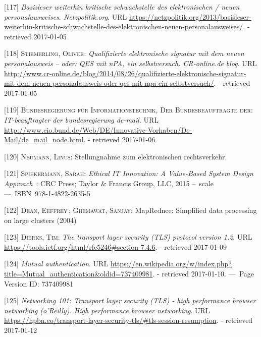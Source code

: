 \documentclass[12pt,english,a4paper,titlepage,cleardoublepage=empty,dottedtoc]{report}
\begin{document}
\hypertarget{ref-web_2013_npa-sicherheitsdefizit}{}
{[}117{]} \emph{Basisleser weiterhin kritische schwachstelle des
elektronischen / neuen personalausweises. Netzpolitik.org}. URL
\url{https://netzpolitik.org/2013/basisleser-weiterhin-kritische-schwachstelle-des-elektronischen-neuen-personalausweises/}.
- retrieved 2017-01-05

\hypertarget{ref-web_2014_test-qes-support-in-npa}{}
{[}118{]} \textsc{Stiemerling, Oliver}: \emph{Qualifizierte
elektronische signatur mit dem neuen personalausweis -- oder: QES mit
nPA, ein selbstversuch. CR-online.de blog}. URL
\url{http://www.cr-online.de/blog/2014/08/26/qualifizierte-elektronische-signatur-mit-dem-neuen-personalausweis-oder-qes-mit-npa-ein-selbstversuch/}.
- retrieved 2017-01-05

\hypertarget{ref-web_2017_about-de-mail}{}
{[}119{]} \textsc{Bundesregierung für Informationstechnik, Der
Bundesbeauftragte der}: \emph{IT-beauftragter der bundesregierung
de-mail}. URL
\url{http://www.cio.bund.de/Web/DE/Innovative-Vorhaben/De-Mail/de_mail_node.html}.
- retrieved 2017-01-06

\hypertarget{ref-statement_2013_de-mail}{}
{[}120{]} \textsc{Neumann, Linus}: Stellungnahme zum elektronischen
rechtsverkehr.

\hypertarget{ref-book_2015_ethical-it-innovation}{}
{[}121{]} \textsc{Spiekermann, Sarah}: \emph{Ethical IT Innovation: A
Value-Based System Design Approach}~: CRC Press; Taylor \& Francis
Group, LLC, 2015 --~scale ---~ISBN~978-1-4822-2635-5

\hypertarget{ref-paper_2004_distributed-mapreduce}{}
{[}122{]} \textsc{Dean, Eeffrey}\,; \textsc{Ghemawat, Sanjay}:
MapRednce: Simplified data processing on large clusters (2004)

\hypertarget{ref-web_spec_tls-12_client-auth}{}
{[}123{]} \textsc{Dierks, Tim}: \emph{The transport layer security (TLS)
protocol version 1.2}. URL
\url{https://tools.ietf.org/html/rfc5246\#section-7.4.6}. - retrieved
2017-01-09

\hypertarget{ref-web_2017_wikipedia_mutual-auth}{}
{[}124{]} \emph{Mutual authentication}. URL
\url{https://en.wikipedia.org/w/index.php?title=Mutual_authentication\&oldid=737409981}.
- retrieved 2017-01-10. ---~Page Version ID: 737409981

\hypertarget{ref-book_2013_networking-101_tls-session-resumption}{}
{[}125{]} \emph{Networking 101: Transport layer security (TLS) - high
performance browser networking (o'Reilly). High performance browser
networking}. URL
\url{https://hpbn.co/transport-layer-security-tls/\#tls-session-resumption}.
- retrieved 2017-01-12
\end{document}
